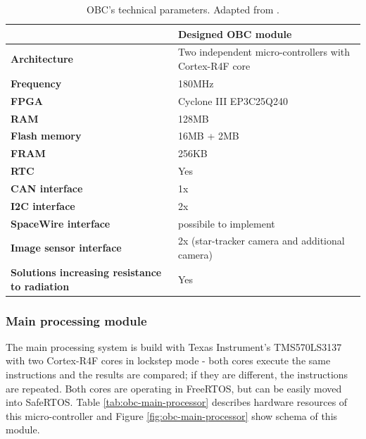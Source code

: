 \documentclass[12pt,a4paper,oneside]{article}
\begin{document}
\begin{table}[!htbp]
\centering
\begin{tabular}{|p{5cm}|p{6cm}|}\hline 
 & \textbf{Designed OBC module} \\ 
\hline 
\textbf{Architecture} & Two independent \newline micro-controllers with \newline Cortex-R4F core \\ 
\hline 
\textbf{Frequency} & 180MHz \\ 
\hline 
\textbf{FPGA} & Cyclone III EP3C25Q240 \\ 
\hline 
\textbf{RAM} & 128MB \\ 
\hline 
\textbf{Flash memory} & 16MB + 2MB \\ 
\hline 
\textbf{FRAM} & 256KB \\ 
\hline 
\textbf{RTC} & Yes \\ 
\hline 
\textbf{CAN interface} & 1x \\ 
\hline 
\textbf{I2C interface} & 2x \\ 
\hline 
\textbf{SpaceWire interface} & possibile to implement \\ 
\hline 
\textbf{Image sensor interface} & 2x (star-tracker camera and additional camera) \\ 
\hline 
\textbf{Solutions increasing resistance to radiation} & Yes \\ 
\hline 
\end{tabular} 
\caption{OBC's technical parameters. Adapted from \citet{gaska2016obc}.}
\label{tab:obc-all}
\end{table}


\subsubsection{Main processing module} 

The main processing system is build with Texas Instrument's TMS570LS3137 with two Cortex-R4F cores in lockstep mode - both cores execute the same instructions and the results are compared; if they are different, the instructions are repeated. Both cores are operating in FreeRTOS, but can be easily moved into SafeRTOS. Table \ref{tab:obc-main-processor} describes hardware resources of this micro-controller and Figure \ref{fig:obc-main-processor} show schema of this module.
\end{document}
